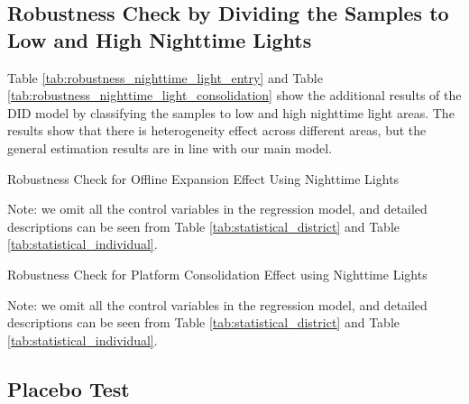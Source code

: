 \documentclass[11pt]{article}
\begin{document}
\newpage


\subsection{Robustness Check by Dividing the Samples to Low and High Nighttime Lights} \label{subsec:nighttime_light_robustness_check}


Table \ref{tab:robustness_nighttime_light_entry} and Table \ref{tab:robustness_nighttime_light_consolidation} show the additional results of the DID model by classifying the samples to low and high nighttime light areas. The results show that there is heterogeneity effect across different areas, but the general estimation results are in line with our main model.

\begin{table}[H]
  \begin{center}
    \begin{scriptsize}
      \caption{Robustness Check for Offline Expansion Effect Using Nighttime Lights}
      \label{tab:robustness_nighttime_light_entry}
      
    
    Note: we omit all the control variables in the regression model, and detailed descriptions can be seen from Table \ref{tab:statistical_district} and Table \ref{tab:statistical_individual}.
    \end{scriptsize}
  \end{center}
\end{table}

\begin{table}[H]
  \begin{center}
    \begin{scriptsize}
      \caption{Robustness Check for Platform Consolidation Effect using Nighttime Lights}
      \label{tab:robustness_nighttime_light_consolidation}
      
    
    Note: we omit all the control variables in the regression model, and detailed descriptions can be seen from Table \ref{tab:statistical_district} and Table \ref{tab:statistical_individual}.
    \end{scriptsize}
  \end{center}
\end{table}

\subsection{Placebo Test} \label{subsec:placebo_test}
\end{document}
